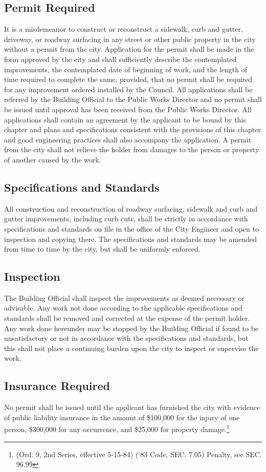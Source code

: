 \subsection{Permit Required}
It is a misdemeanor to construct or reconstruct a sidewalk, curb and gutter, driveway, or roadway surfacing in any street or other public property in the city without a permit from the city. Application for the permit shall be made in the form approved by the city and shall sufficiently describe the contemplated improvements, the contemplated date of beginning of work, and the length of time required to complete the same, provided, that no permit shall be required for any improvement ordered installed by the Council. All applications shall be referred by the Building Official to the Public Works Director and no permit shall be issued until approval has been received from the Public Works Director. All applications shall contain an agreement by the applicant to be bound by this chapter and plans and specifications consistent with the provisions of this chapter and good engineering practices shall also accompany the application. A permit from the city shall not relieve the holder from damages to the person or property of another caused by the work.
\subsection{Specifications and Standards}
All construction and reconstruction of roadway surfacing, sidewalk and curb and gutter improvements, including curb cuts, shall be strictly in accordance with specifications and standards on file in the office of the City Engineer and open to inspection and copying there.  The specifications and standards may be amended from time to time by the city, but shall be uniformly enforced.
\subsection{Inspection}
The Building Official shall inspect the improvements as deemed necessary or advisable.  Any work not done according to the applicable specifications and standards shall be removed and corrected at the expense of the permit holder.  Any work done hereunder may be stopped by the Building Official if found to be unsatisfactory or not in accordance with the specifications and standards, but this shall not place a continuing burden upon the city to inspect or supervise the work.
\subsection{Insurance Required}
No permit shall be issued until the applicant has furnished the city with evidence of public liability insurance in the amount of \$100,000 for the injury of one person, \$300,000 for any occurrence, and \$25,000 for property damage.\footnote{(Ord. 9, 2nd Series, effective 5-15-84)  (‘83 Code, SEC. 7.05)  Penalty, see SEC. 96.99}
